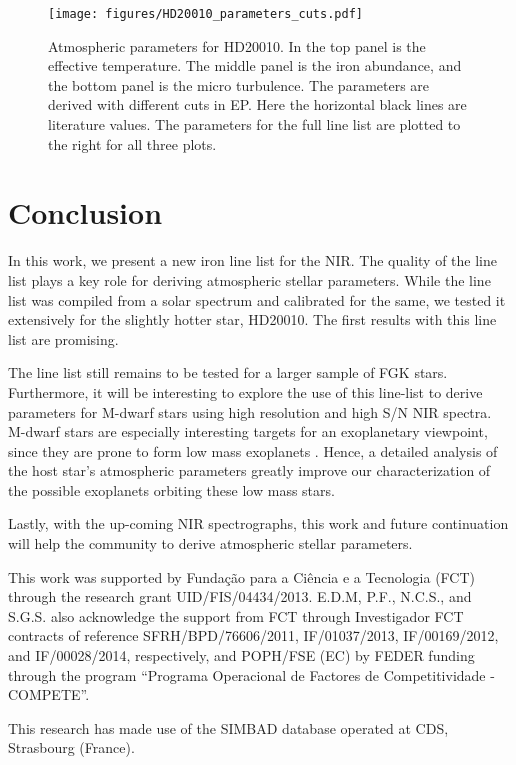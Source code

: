 \documentclass{aa}
\begin{document}
\begin{figure}[tpb!]
    \centering
    \texttt{[image: figures/HD20010\_parameters\_cuts.pdf]}
    \caption{Atmospheric parameters for HD20010. In the top panel is
    the effective temperature. The middle panel is the iron abundance,
    and the bottom panel is the micro turbulence. The parameters are
    derived with different cuts in EP. Here the horizontal black lines
    are literature values. The parameters for the full line list are
    plotted to the right for all three plots.}
    \label{fig:HD20010_parameters_cuts}
\end{figure}




\section{Conclusion}

In this work, we present a new iron line list for the NIR. The quality
of the line list plays a key role for deriving atmospheric stellar
parameters. While the line list was compiled from a solar spectrum and
calibrated for the same, we tested it extensively for the slightly
hotter star, HD20010. The first results with this line list are
promising.

The line list still remains to be tested for a larger sample of FGK
stars. Furthermore, it will be interesting to explore the use of this
line-list to derive parameters for M-dwarf stars using high resolution
and high S/N NIR spectra. M-dwarf stars are especially interesting
targets for an exoplanetary viewpoint, since they are prone to form low
mass exoplanets \citep{Bonfils2013}. Hence, a detailed analysis of the
host star's atmospheric parameters greatly improve our characterization
of the possible exoplanets orbiting these low mass stars.

Lastly, with the up-coming NIR spectrographs, this work and future
continuation will help the community to derive atmospheric stellar
parameters.





\begin{acknowledgements}

This work was supported by Funda\c{c}\~ao para a Ci\^encia e a
Tecnologia (FCT) through the research grant UID/FIS/04434/2013.
E.D.M, P.F., N.C.S., and S.G.S. also acknowledge the support from FCT
through Investigador FCT contracts of reference SFRH/BPD/76606/2011,
IF/01037/2013, IF/00169/2012, and IF/00028/2014, respectively, and
POPH/FSE (EC) by FEDER funding through the program “Programa
Operacional de Factores de Competitividade - COMPETE”.

This research has made use of the SIMBAD database operated at CDS,
Strasbourg (France).

\end{acknowledgements}








\end{document}
